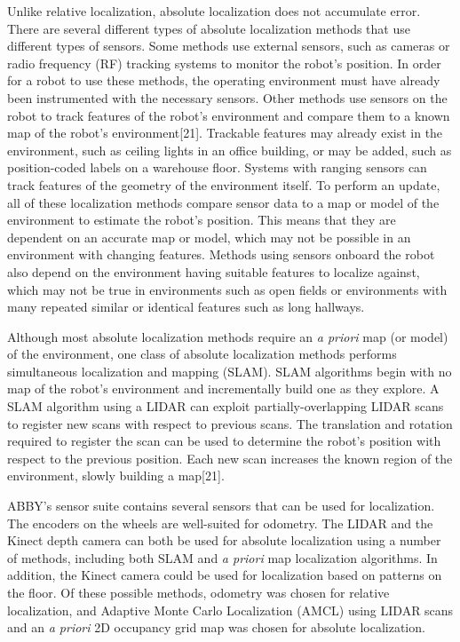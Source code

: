 \documentclass[]{cwru} %
\begin{document}
Unlike relative localization, absolute localization does not accumulate
error. There are several different types of absolute localization
methods that use different types of sensors. Some methods use external
sensors, such as cameras or radio frequency (RF) tracking systems to
monitor the robot's position. In order for a robot to use these methods,
the operating environment must have already been instrumented with the
necessary sensors. Other methods use sensors on the robot to track
features of the robot's environment and compare them to a known map of
the robot's environment{[}21{]}. Trackable features may already exist in
the environment, such as ceiling lights in an office building, or may be
added, such as position-coded labels on a warehouse floor. Systems with
ranging sensors can track features of the geometry of the environment
itself. To perform an update, all of these localization methods compare
sensor data to a map or model of the environment to estimate the robot's
position. This means that they are dependent on an accurate map or
model, which may not be possible in an environment with changing
features. Methods using sensors onboard the robot also depend on the
environment having suitable features to localize against, which may not
be true in environments such as open fields or environments with many
repeated similar or identical features such as long hallways.

Although most absolute localization methods require an \emph{a priori}
map (or model) of the environment, one class of absolute localization
methods performs simultaneous localization and mapping (SLAM). SLAM
algorithms begin with no map of the robot's environment and
incrementally build one as they explore. A SLAM algorithm using a LIDAR
can exploit partially-overlapping LIDAR scans to register new scans with
respect to previous scans. The translation and rotation required to
register the scan can be used to determine the robot's position with
respect to the previous position. Each new scan increases the known
region of the environment, slowly building a map{[}21{]}.

ABBY's sensor suite contains several sensors that can be used for
localization. The encoders on the wheels are well-suited for odometry.
The LIDAR and the Kinect depth camera can both be used for absolute
localization using a number of methods, including both SLAM and \emph{a
priori} map localization algorithms. In addition, the Kinect camera
could be used for localization based on patterns on the floor. Of these
possible methods, odometry was chosen for relative localization, and
Adaptive Monte Carlo Localization (AMCL) using LIDAR scans and an
\emph{a priori} 2D occupancy grid map was chosen for absolute
localization.
\end{document}
